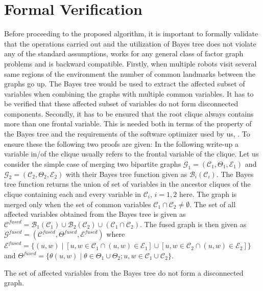 \section{Formal Verification}
Before proceeding to the proposed algorithm, it is important to formally validate that the operations carried out and the utilization of Bayes tree does not violate any of the standard assumptions, works for any general class of factor graph problems and is backward compatible. Firstly, when multiple robots visit several same regions of the environment the number of common landmarks between the graphs go up. The Bayes tree would be used to extract the affected subset of variables when combining the graphs with multiple common variables. It has to be verified that these affected subset of variables do not form disconnected components. Secondly, it has to be ensured that the root clique always contains more than one frontal variable. This is needed both in terms of the property of the Bayes tree and the requirements of the software optimizer used by us, \cite{gtsamhandson}. To ensure these the following two proofs are given:
In the following write-up a variable in/of the clique usually refers to the frontal variable of the clique. Let us consider the simple case of merging two bipartite graphs $\mathcal{G}_1 = (\mathcal{C}_1, \Theta_1, \mathcal{E}_1)$ and $\mathcal{G}_2 = (\mathcal{C}_2, \Theta_2, \mathcal{E}_2)$ with their Bayes tree function given as $\mathcal{B}_i(\mathcal{C}_{i})$. The Bayes tree function returns the union of set of variables in the ancestor cliques of the clique containing each and every variable in $\mathcal{C}_{i}$, $i = 1,2$ here. The graph is merged only when the set of common variables $\mathcal{C}_1 \cap \mathcal{C}_2 \neq \emptyset$. The set of all affected variables obtained from the Bayes tree is given as $\mathcal{C}^{fused} = \mathcal{B}_1(\mathcal{C}_{1}) \cup \mathcal{B}_2(\mathcal{C}_{2}) \cup (\mathcal{C}_1 \cap \mathcal{C}_2)$. The fused graph is then given as $\mathcal{G}^{fused} = (\mathcal{C}^{fused}, \Theta^{fused} ,\mathcal{E}^{fused})$ where $\mathcal{E}^{fused} = \{ (u,w) \mid [u,w \in \mathcal{C}_1 \cap (u,w) \in \mathcal{E}_1] \cup [u,w \in \mathcal{C}_2 \cap (u,w) \in \mathcal{E}_2] \}$ and $\Theta^{fused} = \{ \theta(u,w) \mid \theta \in \Theta_1 \cup \Theta_2; u, w \in \mathcal{C}_1 \cup \mathcal{C}_2 \}$.
\begin{theorem}
The set of affected variables from the Bayes tree do not form a disconnected graph.
\end{theorem}
